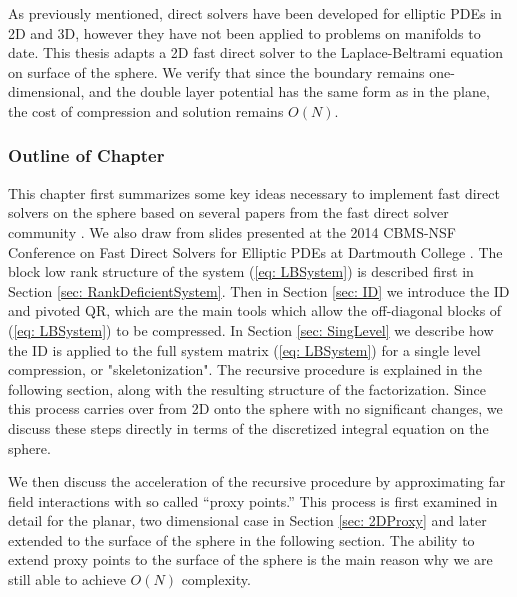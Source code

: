 \documentclass{sfuthesis}
\begin{document}
As previously mentioned, direct solvers have been developed for elliptic PDEs in 2D and 3D, however they have not been applied to problems on manifolds to date. This thesis adapts a 2D fast direct solver to the Laplace-Beltrami equation on surface of the sphere. We verify that since the boundary remains one-dimensional, and the double layer potential has the same form as in the plane, the cost of compression and solution remains $O(N)$. 


\subsubsection{Outline of Chapter}

This chapter first summarizes some key ideas necessary to implement fast direct solvers on the sphere based on several papers from the fast direct solver community \cite{GillYoungMart2012, HoGreen2012, MartRokh2005, ChengEtAl2005}. We also draw from slides presented at the 2014 CBMS-NSF Conference on Fast Direct Solvers for Elliptic PDEs at Dartmouth College \cite{CBMS}. The block low rank structure of the system (\ref{eq: LBSystem}) is described first in Section \ref{sec: RankDeficientSystem}. Then in Section \ref{sec: ID} we introduce the ID and pivoted QR, which are the main tools which allow the off-diagonal blocks of (\ref{eq: LBSystem}) to be compressed. In Section \ref{sec: SingLevel} we describe how the ID is applied to the full system matrix (\ref{eq: LBSystem}) for a single level compression, or "skeletonization". The recursive procedure is explained in the following section, along with the resulting structure of the factorization. Since this process carries over from 2D onto the sphere with no significant changes, we discuss these steps directly in terms of the discretized integral equation on the sphere. 

We then discuss the acceleration of the recursive procedure by approximating far field interactions with so called \enquote{proxy points.} This process is first examined in detail for the planar, two dimensional case in Section \ref{sec: 2DProxy} and later extended to the surface of the sphere in the following section. The ability to extend proxy points to the surface of the sphere is the main reason why we are still able to achieve $O(N)$ complexity.
\end{document}

